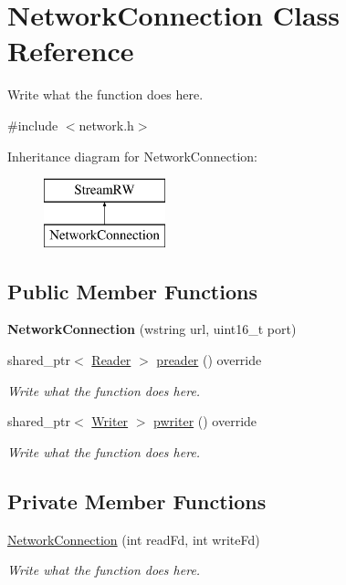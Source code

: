 \hypertarget{classNetworkConnection}{\section{Network\+Connection Class Reference}
\label{classNetworkConnection}
}


Write what the function does here.  




{\ttfamily \#include $<$network.\+h$>$}

Inheritance diagram for Network\+Connection\+:\begin{figure}[H]
\begin{center}
\leavevmode
\includegraphics[height=2.000000cm]{classNetworkConnection}
\end{center}
\end{figure}
\subsection*{Public Member Functions}
\begin{DoxyCompactItemize}
\item 
\hypertarget{classNetworkConnection_a78733e203c2aef9a0cb1538476c637d7}{{\bfseries Network\+Connection} (wstring url, uint16\+\_\+t port)}\label{classNetworkConnection_a78733e203c2aef9a0cb1538476c637d7}

\item 
shared\+\_\+ptr$<$ \hyperlink{classReader}{Reader} $>$ \hyperlink{classNetworkConnection_a3cd959362a6b007ad005f330463c2216}{preader} () override
\begin{DoxyCompactList}\small\item\em Write what the function does here. \end{DoxyCompactList}\item 
shared\+\_\+ptr$<$ \hyperlink{classWriter}{Writer} $>$ \hyperlink{classNetworkConnection_a2cc73fa5d5c9b4cf74579946dc136b5a}{pwriter} () override
\begin{DoxyCompactList}\small\item\em Write what the function does here. \end{DoxyCompactList}\end{DoxyCompactItemize}
\subsection*{Private Member Functions}
\begin{DoxyCompactItemize}
\item 
\hyperlink{classNetworkConnection_a9a07574433d99140bae5f156c1985394}{Network\+Connection} (int read\+Fd, int write\+Fd)
\begin{DoxyCompactList}\small\item\em Write what the function does here. \end{DoxyCompactList}\end{DoxyCompactItemize}
